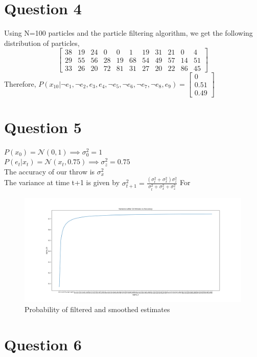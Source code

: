 \documentclass[letter, 10pt]{article}
\begin{document}
\section*{Question 4}Using N=100 particles and the particle filtering algorithm, we get the following distribution of particles,
\begin{equation*}
    \begin{bmatrix}
    38 & 19 & 24 & 0 & 0 & 1 & 19 & 31 & 21 & 0 & 4\\
    29 & 55 & 56 & 28 & 19 & 68 & 54 & 49 & 57 & 14 & 51\\
    33 & 26 & 20 & 72 & 81 & 31 & 27 & 20 & 22 & 86 & 45
    \end{bmatrix}
\end{equation*}
Therefore, $P(x_{10}|\neg e_1, \neg e_2, e_3, e_4, \neg e_5, \neg e_6, \neg e_7, \neg e_8, e_9) = \begin{bmatrix}0\\0.51\\0.49\end{bmatrix}$
\section*{Question 5}
$P(x_0) = \mathcal{N}(0,1) \implies \sigma_0^2=1$\\
$P(e_t|x_t) = \mathcal{N}(x_t,0.75) \implies \sigma_z^2=0.75$\\
The accuracy of our throw is $\sigma_x^2$\\
The variance at time t+1 is given by $\sigma_{t+1}^2 = \frac{(\sigma_t^2 + \sigma_x^2)\sigma_z^2}{\sigma_t^2 + \sigma_x^2 + \sigma_z^2}$
For 

\begin{figure}[H]
    \centering
        \includegraphics[width=\textwidth]{HW3/variance.png}
    \caption{Probability of filtered and smoothed estimates}
\end{figure}

\section*{Question 6}
\end{document}

